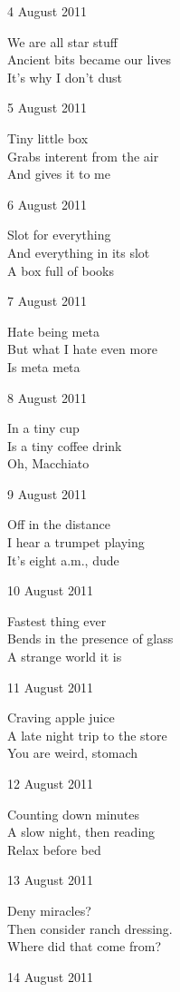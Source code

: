 \documentclass[12pt]{article}
\begin{document}
\newpage

4 August 2011

We are all star stuff \\
Ancient bits became our lives \\
It's why I don't dust

5 August 2011

Tiny little box \\
Grabs interent from the air \\
And gives it to me

6 August 2011

Slot for everything \\
And everything in its slot \\
A box full of books

7 August 2011

Hate being meta \\
But what I hate even more \\
Is meta meta

8 August 2011

In a tiny cup \\
Is a tiny coffee drink \\
Oh, Macchiato

9 August 2011

Off in the distance \\
I hear a trumpet playing \\
It's eight a.m., dude

10 August 2011

Fastest thing ever \\
Bends in the presence of glass \\
A strange world it is

\newpage

11 August 2011

Craving apple juice \\
A late night trip to the store \\
You are weird, stomach

12 August 2011

Counting down minutes \\
A slow night, then reading \\
Relax before bed

13 August 2011

Deny miracles? \\
Then consider ranch dressing. \\
Where did that come from?

14 August 2011
\end{document}

